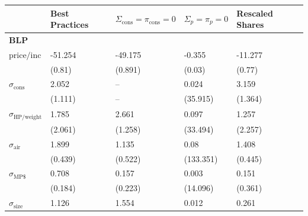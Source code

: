 \begin{tabular}{lllll}
\midrule
                                                         & Best Practices   & $\Sigma_{\text{cons}} = \pi_{\text{cons}} = 0 $   & $\Sigma_p = \pi_p = 0 $   & Rescaled Shares   \\
\midrule
 \midrule \textbf{BLP} \\ \midrule $\text{price}/\text{inc}$ & -51.254          & -49.175                                           & -0.355                    & -11.277           \\
                                                         & (0.81)           & (0.891)                                           & (0.03)                    & (0.77)            \\
 $\sigma_{\text{cons}}$                                  & 2.052            & --                                                & 0.024                     & 3.159             \\
                                                         & (1.111)          & --                                                & (35.915)                  & (1.364)           \\
 $\sigma_{\text{HP/weight}}$                             & 1.785            & 2.661                                             & 0.097                     & 1.257             \\
                                                         & (2.061)          & (1.258)                                           & (33.494)                  & (2.257)           \\
 $\sigma_{\text{air}}$                                   & 1.899            & 1.135                                             & 0.08                      & 1.408             \\
                                                         & (0.439)          & (0.522)                                           & (133.351)                 & (0.445)           \\
 $\sigma_{\text{MP\$}}$                                  & 0.708            & 0.157                                             & 0.003                     & 0.151             \\
                                                         & (0.184)          & (0.223)                                           & (14.096)                  & (0.361)           \\
 $\sigma_{\text{size}}$                                  & 1.126            & 1.554                                             & 0.012                     & 0.261             \\

\end{tabular}
